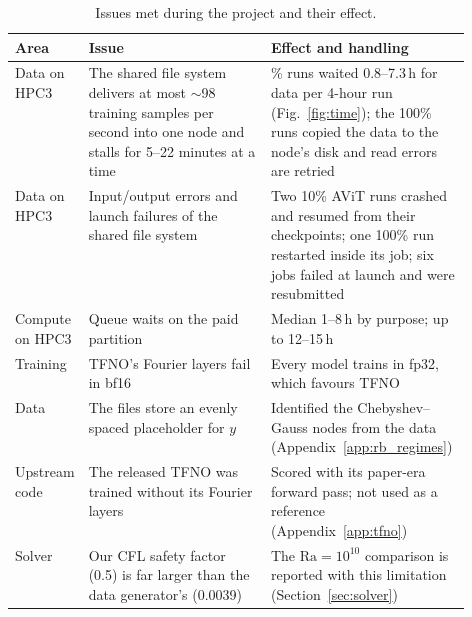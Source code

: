 \documentclass[11pt]{article}
\begin{document}
\begin{table}[!htbp]
\centering\footnotesize
\begin{tabularx}{\linewidth}{@{}>{\raggedright\arraybackslash}p{0.13\linewidth}>{\raggedright\arraybackslash}p{0.4\linewidth}>{\raggedright\arraybackslash}X@{}}
\toprule
Area & Issue & Effect and handling \\
\midrule
Data on HPC3 & The shared file system delivers at most $\sim$98 training samples per second into one node and stalls
for 5--22 minutes at a time & 10\% runs waited 0.8--7.3\,h for data per 4-hour run (Fig.~\ref{fig:time}); the 100\%
runs copied the data to the node's disk and read errors are retried \\ \addlinespace[3pt]
\midrule
Data on HPC3 & Input/output errors and launch failures of the shared file system & Two 10\% AViT runs crashed and
resumed from their checkpoints; one 100\% run restarted inside its job; six jobs failed at launch and were
resubmitted \\ \addlinespace[3pt]
\midrule
Compute on HPC3 & Queue waits on the paid partition & Median 1--8\,h by purpose; up to 12--15\,h \\
\addlinespace[3pt]
\midrule
Training & TFNO's Fourier layers fail in bf16 & Every model trains in fp32, which favours TFNO \\ \addlinespace[3pt]
\midrule
Data & The files store an evenly spaced placeholder for $y$ & Identified the Chebyshev--Gauss nodes from the data
(Appendix~\ref{app:rb_regimes}) \\ \addlinespace[3pt]
\midrule
Upstream code & The released TFNO was trained without its Fourier layers & Scored with its paper-era forward pass;
not used as a reference (Appendix~\ref{app:tfno}) \\ \addlinespace[3pt]
\midrule
Solver & Our CFL safety factor (0.5) is far larger than the data generator's (0.0039) & The $\mathrm{Ra}=10^{10}$
comparison is reported with this limitation (Section~\ref{sec:solver}) \\
\bottomrule
\end{tabularx}
\caption{Issues met during the project and their effect.}
\label{tab:issues}
\end{table}
\end{document}
